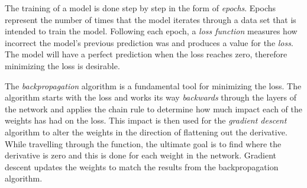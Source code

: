 \documentclass[nofilelist]{cslthse-msc}
\begin{document}
The training of a model is done step by step in the form of \textit{epochs}. Epochs represent the number of times that the model iterates through a data set that is intended to train the model. Following each epoch, a \textit{loss function} measures how incorrect the model's previous prediction was and produces a value for the \textit{loss}. The model will have a perfect prediction when the loss reaches zero, therefore minimizing the loss is desirable. 

The \textit{backpropagation} algorithm is a fundamental tool for minimizing the loss. The algorithm starts with the loss and works its way \textit{backwards} through the layers of the network and applies the chain rule to determine how much impact each of the weights has had on the loss. This impact is then used for the \textit{gradient descent} algorithm to alter the weights in the direction of flattening out the derivative. While travelling through the function, the ultimate goal is to find where the derivative is zero and this is done for each weight in the network. Gradient descent updates the weights to match the results from the backpropagation algorithm. 






\end{document}

